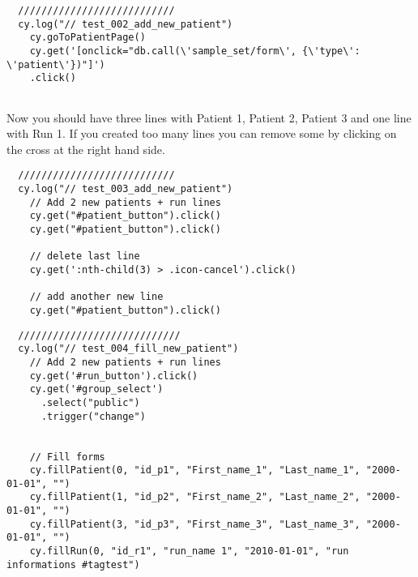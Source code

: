 \begin{verbatim}
  ///////////////////////////
  cy.log("// test_002_add_new_patient")
    cy.goToPatientPage()
    cy.get('[onclick="db.call(\'sample_set/form\', {\'type\': \'patient\'})"]')
    .click()


\end{verbatim}

  Now you should have three lines with Patient 1, Patient 2, Patient 3 and one
  line with Run 1.
  If you created too many lines you can remove some by clicking on the cross at
  the right hand side.

\begin{verbatim}
  ///////////////////////////
  cy.log("// test_003_add_new_patient")
    // Add 2 new patients + run lines
    cy.get("#patient_button").click()
    cy.get("#patient_button").click()

    // delete last line
    cy.get(':nth-child(3) > .icon-cancel').click()

    // add another new line
    cy.get("#patient_button").click()

\end{verbatim}

\begin{verbatim}
  ////////////////////////////
  cy.log("// test_004_fill_new_patient")
    // Add 2 new patients + run lines
    cy.get('#run_button').click()
    cy.get('#group_select')
      .select("public")
      .trigger("change")


    // Fill forms
    cy.fillPatient(0, "id_p1", "First_name_1", "Last_name_1", "2000-01-01", "")
    cy.fillPatient(1, "id_p2", "First_name_2", "Last_name_2", "2000-01-01", "")
    cy.fillPatient(3, "id_p3", "First_name_3", "Last_name_3", "2000-01-01", "")
    cy.fillRun(0, "id_r1", "run_name 1", "2010-01-01", "run informations #tagtest")
 

\end{verbatim}

